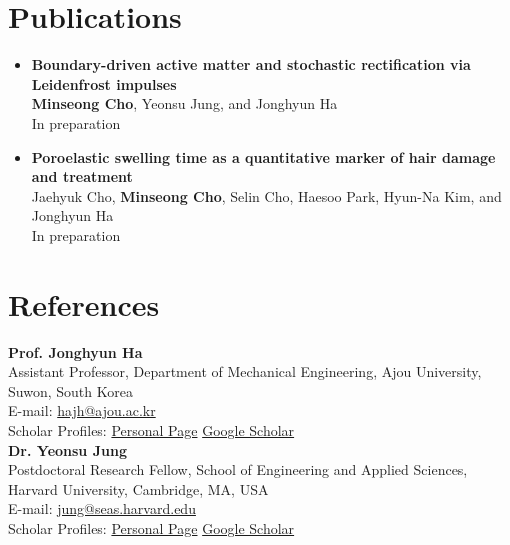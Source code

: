 \documentclass[a4paper,10pt]{article}
\newcommand{\sep}{\hspace{6pt}\textcolor{muted}{\textbar}\hspace{6pt}}
\newcommand{\cvsubline}[1]{\textcolor{muted}{#1}}
\newcommand{\cvpublicationtitlefont}{\fontsize{10.7pt}{12pt}\selectfont}
\newcommand{\cvpublicationauthorsfont}{\fontsize{9.4pt}{12pt}\selectfont}
\newcommand{\cvpublicationstatusfont}{\fontsize{9.2pt}{12pt}\selectfont}
\newcommand{\cvpublicationtitle}[1]{{\cvpublicationtitlefont\textbf{\textcolor{textmain}{#1}}}}
\newcommand{\cvpublicationauthors}[1]{{\cvpublicationauthorsfont\textcolor{muted}{#1}}}
\newcommand{\cvpreparation}{{\cvpublicationstatusfont\cvsubline{\raisebox{-0.04ex}{\scalebox{0.82}{\faHourglassHalf}}\hspace{0.4em}In preparation}}}
\begin{document}
\section*{Publications}
\begin{itemize}
  \item \cvpublicationtitle{Boundary-driven active matter and stochastic rectification via Leidenfrost impulses}\\
  \cvpublicationauthors{\textbf{Minseong Cho}, Yeonsu Jung, and Jonghyun Ha}\\
  \cvpreparation

  \item \cvpublicationtitle{Poroelastic swelling time as a quantitative marker of hair damage and treatment}\\
  \cvpublicationauthors{Jaehyuk Cho, \textbf{Minseong Cho}, Selin Cho, Haesoo Park, Hyun-Na Kim, and Jonghyun Ha}\\
  \cvpreparation
\end{itemize}

\section*{References}
\textbf{Prof. Jonghyun Ha}\\
\cvsubline{Assistant Professor, Department of Mechanical Engineering, Ajou University, Suwon, South Korea}\\
E-mail: \href{mailto:hajh@ajou.ac.kr}{hajh@ajou.ac.kr}\\
Scholar Profiles:
\href{https://www.softlab.ajou.ac.kr/people-ha}{Personal Page} \sep
\href{https://scholar.google.com/citations?user=H73RmsAAAAAJ}{Google Scholar}\\[5pt]

\textbf{Dr. Yeonsu Jung}\\
\cvsubline{Postdoctoral Research Fellow, School of Engineering and Applied Sciences, Harvard University, Cambridge, MA, USA}\\
E-mail: \href{mailto:jung@seas.harvard.edu}{jung@seas.harvard.edu}\\
Scholar Profiles:
\href{https://yeonsu-jung.github.io}{Personal Page} \sep
\href{https://scholar.google.com/citations?user=BMZc1CcAAAAJ}{Google Scholar}
\end{document}
